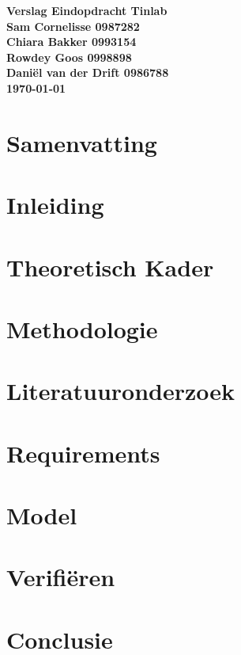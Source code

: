 \documentclass{article}
\begin{document}
\sffamily
\begin{titlepage}
  \centering
    \vfill
    {\bfseries\Huge
      Verslag Eindopdracht Tinlab \\
        \vskip2cm
      }
      {\bfseries\Large
        Sam Cornelisse 0987282\\
	Chiara Bakker 0993154\\
	Rowdey Goos 0998898\\
	Daniël van der Drift 0986788\\
      }
      {
        \bfseries\normalsize
        \vskip1cm
        \today\\
    }
    \vfill
    \vfill
    \vfill
\end{titlepage}
\newpage
\tableofcontents

\newpage
\section{Samenvatting}


\section{Inleiding}


\section{Theoretisch Kader}


\section{Methodologie}


\section{Literatuuronderzoek}


\section{Requirements}


\section{Model}


\section{Verifiëren}


\section{Conclusie}


\newpage


\end{document}
